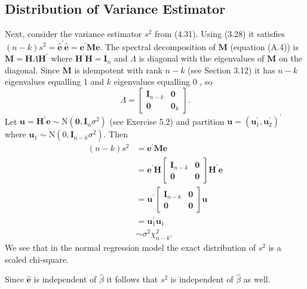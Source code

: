 \documentclass[10pt]{article}
\begin{document}
\subsection{Distribution of Variance Estimator}
Next, consider the variance estimator $s^{2}$ from (4.31). Using (3.28) it satisfies $(n-k) s^{2}=\widehat{\boldsymbol{e}}^{\prime} \widehat{\boldsymbol{e}}=\boldsymbol{e}^{\prime} \boldsymbol{M} \boldsymbol{e}$. The spectral decomposition of $\boldsymbol{M}$ (equation (A.4)) is $\boldsymbol{M}=\boldsymbol{H} \Lambda \boldsymbol{H}^{\prime}$ where $\boldsymbol{H}^{\prime} \boldsymbol{H}=\boldsymbol{I}_{n}$ and $\Lambda$ is diagonal with the eigenvalues of $\boldsymbol{M}$ on the diagonal. Since $\boldsymbol{M}$ is idempotent with rank $n-k$ (see Section 3.12) it has $n-k$ eigenvalues equalling 1 and $k$ eigenvalues equalling 0 , so
$$
\Lambda=\left[\begin{array}{cc}
\boldsymbol{I}_{n-k} & \mathbf{0} \\
\mathbf{0} & \mathbf{0}_{k}
\end{array}\right] .
$$
Let $\boldsymbol{u}=\boldsymbol{H}^{\prime} \boldsymbol{e} \sim \mathrm{N}\left(\mathbf{0}, \boldsymbol{I}_{n} \sigma^{2}\right)$ (see Exercise 5.2) and partition $\boldsymbol{u}=\left(\boldsymbol{u}_{1}^{\prime}, \boldsymbol{u}_{2}^{\prime}\right)^{\prime}$ where $\boldsymbol{u}_{1} \sim \mathrm{N}\left(0, \boldsymbol{I}_{n-k} \sigma^{2}\right)$. Then
$$
\begin{aligned}
(n-k) s^{2} &=\boldsymbol{e}^{\prime} \boldsymbol{M} \boldsymbol{e} \\
&=\boldsymbol{e}^{\prime} \boldsymbol{H}\left[\begin{array}{cc}
\boldsymbol{I}_{n-k} & \mathbf{0} \\
\mathbf{0} & \mathbf{0}
\end{array}\right] \boldsymbol{H}^{\prime} \boldsymbol{e} \\
&=\boldsymbol{u}^{\prime}\left[\begin{array}{cc}
\boldsymbol{I}_{n-k} & \mathbf{0} \\
\mathbf{0} & \mathbf{0}
\end{array}\right] \boldsymbol{u} \\
&=\boldsymbol{u}_{1}^{\prime} \boldsymbol{u}_{1} \\
& \sim \sigma^{2} \chi_{n-k}^{2} .
\end{aligned}
$$
We see that in the normal regression model the exact distribution of $s^{2}$ is a scaled chi-square.

Since $\widehat{\boldsymbol{e}}$ is independent of $\widehat{\beta}$ it follows that $s^{2}$ is independent of $\widehat{\beta}$ as well.
\end{document}
